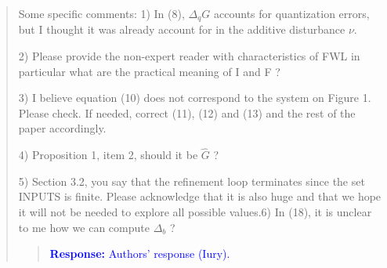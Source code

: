 \documentclass[11pt]{article}
\begin{document}
\begin{quote}
Some specific comments:
1) In (8), $\Delta_{q} G$ accounts for quantization errors, but I thought it was already account for in the additive disturbance $\nu$.

2) Please provide the non-expert reader with characteristics of FWL in particular what are the practical meaning of I and F ?

3) I believe equation (10) does not correspond to the system on Figure 1. Please check. If needed, correct (11), (12) and (13) and the rest of the paper accordingly.

4) Proposition 1, item 2, should it be $\hat G$ ?

5) Section 3.2, you say that the refinement loop terminates since the set INPUTS is finite. Please acknowledge that it is also huge and that we hope it will not be needed to explore all possible values.6) In (18), it is unclear to me how we can compute  $\Delta_b$ ?

\begin{quote}
\textcolor{blue}{\textbf{Response:} Authors' response (Iury).}
\end{quote}


\end{quote}


\newpage
\end{document}
